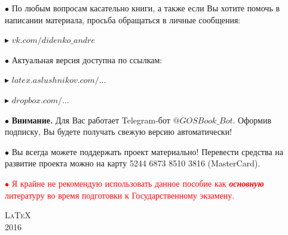 \begin{flushleft}
	$\bullet$ По любым вопросам касательно книги, а также если Вы хотите помочь в написании материала, просьба обращаться в личные сообщения: 
	
	\vspace*{0.2\baselineskip}
	
	\qquad\textcolor{Purplemountainmajesty}{$\blacktriangleright$ }\href{https://vk.com/didenko_andre}{$vk.com/didenko\_andre$}
	
	\vfill
	
	$\bullet$ Актуальная версия доступна по ссылкам:
	
	\vspace*{0.2\baselineskip}
	
	\qquad\textcolor{Purplemountainmajesty}{$\blacktriangleright$ }\href{http://latex.aslushnikov.com/compile?git=https://github.com/DidenkoAndre/GOS_book&target=_main.tex}{\large \textcolor{Purplemountainmajesty}{$latex.aslushnikov.com/...$}}
	
	\vspace*{0.2\baselineskip}
	
	\qquad\textcolor{Purplemountainmajesty}{$\blacktriangleright$ }\href{https://www.dropbox.com/sh/7e5mfj8q68o2ipp/AAD8XvpZhiJzFbEh_IeH305ia?dl=0&preview=GOSBook.pdf}{\large \textcolor{Purplemountainmajesty}{$dropbox.com/...$}}
	
	\vfill
	
	$\bullet$ \textbf{Внимание.} Для Вас работает Telegram-бот \href{https://t.me/GOSBook_Bot}{\textcolor{PersianBlue}{$@GOSBook\_Bot$}}. Оформив подписку\footnotemark{}, Вы будете получать свежую версию автоматически!
	
	
	\vfill
	
	$\bullet$ Вы всегда можете поддержать проект материально! 
	Перевести средства на развитие проекта можно на карту {\large 5244 6873 8510 3816} \textsf{(MasterCard)}.
	
	\bigskip
	\vfill
	
	\bigskip
	\vfill
	
	\textcolor{red}{
		$\bullet$ Я крайне не рекомендую использовать данное пособие как \textit{\textbf{основную}} литературу во время подготовки к Государственному экзамену.
	}
\end{flushleft}

\vfill
{\LARGE\scshape \LaTeX}\\[0.5\baselineskip]
{\LARGE\scshape 2016}\par
\restoregeometry
\endgroup